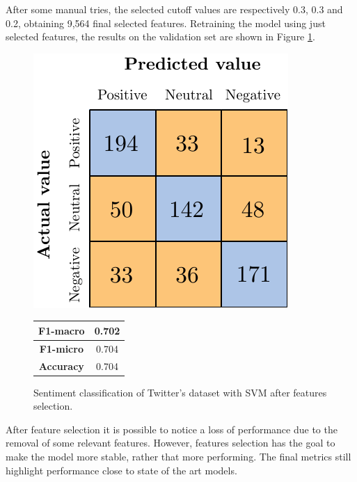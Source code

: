 
After some manual tries, the selected cutoff values are respectively 0.3, 0.3 and 0.2, obtaining 9,564 final selected features. Retraining the model using just selected features, the results on the validation set are shown in Figure \ref{fig:tw_snt_svm_afs}.%


\begin{figure}[H]
	\begin{minipage}[b]{0.60\linewidth}
	\centering
	\includegraphics[scale=1]{figures/conf_matrices/twitter_snt_svm/twitter_snt_svm_afs.pdf}
	\end{minipage}
\begin{minipage}[b]{0.3\linewidth}
	\centering
	\begin{tabular}[b]{ | c | c | } 
		\hline
		\textbf{F1-macro} & 0.702 \\
		\hline
		\textbf{F1-micro} & 0.704 \\ 
		\hline
		\textbf{Accuracy} & 0.704 \\ 
		\hline
	\end{tabular}
\end{minipage}
	\caption{Sentiment classification of Twitter's dataset with SVM after features selection.}
	\label{fig:tw_snt_svm_afs}
\end{figure}



After feature selection it is possible to notice a loss of performance due to the removal of some relevant features. However, features selection has the goal to make the model more stable, rather that more performing. The final metrics still highlight performance close to state of the art models.


